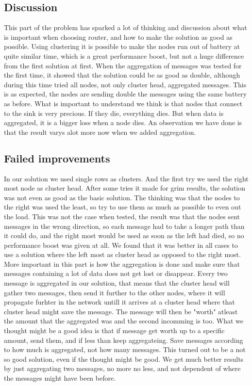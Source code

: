 \documentclass{article}
\begin{document}
  \subsection{Discussion}
    This part of the problem has sparked a lot of thinking and discussion about what
    is important when choosing router, and how to make the solution as good as possible. 
    Using clustering it is possible to make the nodes run out of battery at quite similar 
    time, which is a great performance boost, but not a huge difference from the first solution
    at first. When the aggregation of messages was tested for the first time, it showed that the
    solution could be as good as double, although during this time tried all nodes, not only
    cluster head, aggregated messages. This is as expected, the nodes are sending double the
    messages using the same battery as before. What is important to understand we think is 
    that nodes that connect to the sink is very precious. If they die, everything dies. 
    But when data is aggregated, it is a bigger loss when a node dies. An observation
    we have done is that the result varys alot more now when we added aggregation. 

  \subsection{Failed improvements}
    In our solution we used single rows as clusters. And the first try we used the 
    right most node as cluster head. After some tries it made for grim results, the solution 
    was not even as good as the basic solution. The thinking was that the nodes
    to the right was used the least, so try to use them as much as possible to
    even out the load. This was not the case when tested, the result was that
    the nodes sent messages in the wrong direction, so each message had to take a 
    longer path than it could do, and the right most would be used as soon as the
    left had died, so no performance boost was given at all. We found that it
    was better in all cases to use a solution where the left most as cluster head 
    as opposed to the right most. More important in this part is how the aggregation 
    is done and make sure that messages containing a lot of data does not get lost or
    disappear. 
    Every two message is aggregated in our solution, that means that the cluster head will
    gather two messages, then send it further to the other nodes, where it will propagate
    furhter in the network untill it arrives at a cluster head where that cluster head
    might save the message. The message will then be "worth" atleast the amount that 
    the aggregated was and the second incomming is too. What we thought might be a 
    good idea is that if message get worth up to a specific amount, send them, and 
    if less than keep aggregateing. Save messages according to how much is aggregated, 
    not how many messages. This turned out to be a not so good solution, even if the 
    thought might be good. We get much better results by just aggregating two messages,
    no more no less, and not dependent of where the messages might have been before.
\end{document}
